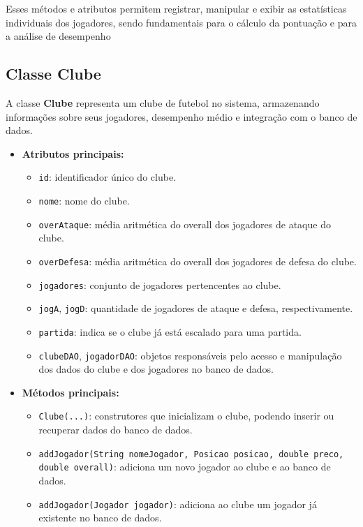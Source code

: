 \documentclass[12pt]{article}
\begin{document}
Esses métodos e atributos permitem registrar, manipular e exibir as estatísticas individuais dos jogadores, sendo fundamentais para o cálculo da pontuação e para a análise de desempenho

\subsection{Classe Clube}

A classe \textbf{Clube} representa um clube de futebol no sistema, armazenando informações sobre seus jogadores, desempenho médio e integração com o banco de dados.

\begin{itemize}
  \item \textbf{Atributos principais:}
        \begin{itemize}
          \item \texttt{id}: identificador único do clube.
          \item \texttt{nome}: nome do clube.
          \item \texttt{overAtaque}: média aritmética do overall dos jogadores de ataque do clube.
          \item \texttt{overDefesa}: média aritmética do overall dos jogadores de defesa do clube.
          \item \texttt{jogadores}: conjunto de jogadores pertencentes ao clube.
          \item \texttt{jogA}, \texttt{jogD}: quantidade de jogadores de ataque e defesa, respectivamente.
          \item \texttt{partida}: indica se o clube já está escalado para uma partida.
          \item \texttt{clubeDAO}, \texttt{jogadorDAO}: objetos responsáveis pelo acesso e manipulação dos dados do clube e dos jogadores no banco de dados.
        \end{itemize}
  \item \textbf{Métodos principais:}
        \begin{itemize}
          \item \texttt{Clube(...)}: construtores que inicializam o clube, podendo inserir ou recuperar dados do banco de dados.
          \item \texttt{addJogador(String nomeJogador, Posicao posicao, double preco, double overall)}: adiciona um novo jogador ao clube e ao banco de dados.
          \item \texttt{addJogador(Jogador jogador)}: adiciona ao clube um jogador já existente no banco de dados.

\end{itemize}
\end{itemize}
\end{document}
